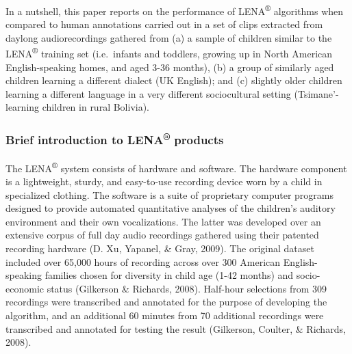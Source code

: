 \documentclass[english,floatsintext,man]{apa6}
\begin{document}
In a nutshell, this paper reports on the performance of
LENA\textsuperscript{®} algorithms when compared to human annotations
carried out in a set of clips extracted from daylong audiorecordings
gathered from (a) a sample of children similar to the
LENA\textsuperscript{®} training set (i.e.~infants and toddlers, growing
up in North American English-speaking homes, and aged 3-36 months), (b)
a group of similarly aged children learning a different dialect (UK
English); and (c) slightly older children learning a different language
in a very different sociocultural setting (Tsimane'-learning children in
rural Bolivia).

\subsubsection{\texorpdfstring{Brief introduction to
LENA\textsuperscript{®}
products}{Brief introduction to LENA® products}}\label{brief-introduction-to-lena-products}

The LENA\textsuperscript{®} system consists of hardware and software.
The hardware component is a lightweight, sturdy, and easy-to-use
recording device worn by a child in specialized clothing. The software
is a suite of proprietary computer programs designed to provide
automated quantitative analyses of the children's auditory environment
and their own vocalizations. The latter was developed over an extensive
corpus of full day audio recordings gathered using their patented
recording hardware (D. Xu, Yapanel, \& Gray, 2009). The original dataset
included over 65,000 hours of recording across over 300 American
English-speaking families chosen for diversity in child age (1-42
months) and socio-economic status (Gilkerson \& Richards, 2008).
Half-hour selections from 309 recordings were transcribed and annotated
for the purpose of developing the algorithm, and an additional 60
minutes from 70 additional recordings were transcribed and annotated for
testing the result (Gilkerson, Coulter, \& Richards, 2008).
\end{document}
